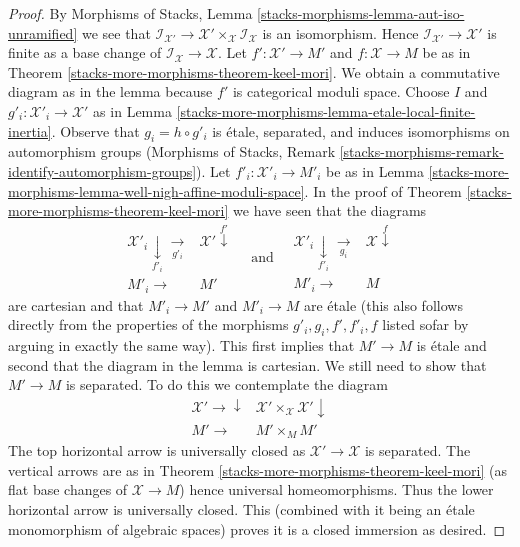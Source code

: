 \begin{proof}
By Morphisms of Stacks, Lemma \ref{stacks-morphisms-lemma-aut-iso-unramified}
we see that
$\mathcal{I}_{\mathcal{X}'} \to
\mathcal{X}' \times_\mathcal{X} \mathcal{I}_\mathcal{X}$
is an isomorphism. Hence $\mathcal{I}_{\mathcal{X}'} \to \mathcal{X}'$
is finite as a base change of $\mathcal{I}_\mathcal{X} \to \mathcal{X}$.
Let $f' : \mathcal{X}' \to M'$ and $f : \mathcal{X} \to M$ be as in
Theorem \ref{stacks-more-morphisms-theorem-keel-mori}.
We obtain a commutative diagram as in the lemma because
$f'$ is categorical moduli space.
Choose $I$ and $g'_i : \mathcal{X}'_i \to \mathcal{X}'$ as in
Lemma \ref{stacks-more-morphisms-lemma-etale-local-finite-inertia}.
Observe that $g_i = h \circ g'_i$
is \'etale, separated, and induces isomorphisms on
automorphism groups (Morphisms of Stacks, Remark
\ref{stacks-morphisms-remark-identify-automorphism-groups}).
Let $f'_i : \mathcal{X}'_i \to M'_i$ be as in
Lemma \ref{stacks-more-morphisms-lemma-well-nigh-affine-moduli-space}.
In the proof of Theorem \ref{stacks-more-morphisms-theorem-keel-mori}
we have seen that the diagrams
$$
\begin{array}{cc}\mathcal{X}'_i \underset{f'_i}{\downarrow}\underset{g'_i}{\longrightarrow} & \mathcal{X}' \overset{f'}{\downarrow} \\ M'_i \longrightarrow & M'\end{array}
\quad\text{and}\quad
\begin{array}{cc}\mathcal{X}'_i \underset{f'_i}{\downarrow}\underset{g_i}{\longrightarrow} & \mathcal{X} \overset{f}{\downarrow} \\ M'_i \longrightarrow & M\end{array}
$$
are cartesian and that $M'_i \to M'$ and $M'_i \to M$ are \'etale
(this also follows directly from the properties of the morphisms
$g'_i, g_i, f', f'_i, f$ listed sofar by arguing in exactly the same way).
This first implies that $M' \to M$ is \'etale and second that
the diagram in the lemma is cartesian. We still need to show
that $M' \to M$ is separated. To do this we contemplate the
diagram
$$
\begin{array}{cc}\mathcal{X}' \longrightarrow\downarrow & \mathcal{X}' \times_\mathcal{X} \mathcal{X}' \downarrow \\ M' \longrightarrow & M' \times_M M'\end{array}
$$
The top horizontal arrow is universally closed as
$\mathcal{X}' \to \mathcal{X}$ is separated.
The vertical arrows are as in Theorem \ref{stacks-more-morphisms-theorem-keel-mori}
(as flat base changes of $\mathcal{X} \to M$)
hence universal homeomorphisms. Thus the lower horizontal
arrow is universally closed. This (combined with it being an \'etale
monomorphism of algebraic spaces) proves it is a closed immersion as desired.
\end{proof}

